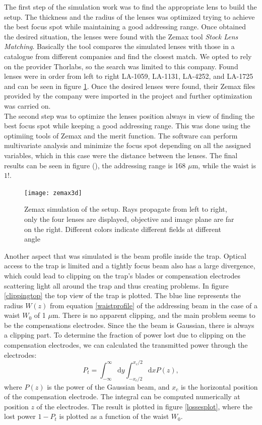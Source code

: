 The first step of the simulation work was to find the appropriate lens to build the setup. The thickness and the radius of the lenses was optimized trying to achieve the best focus spot while maintaining a good addressing range. Once obtained the desired situation, the lenses were found with the Zemax tool \emph{Stock Lens Matching}. Basically the tool compares the simulated lenses with those in a catalogue from different companies and find the closest match. We opted to rely on the provider Thorlabs, so the search was limited to this company. Found lenses were in order from left to right LA-1059, LA-1131, LA-4252, and LA-1725 and can be seen in figure \ref{zemaxview}. Once the desired lenses were found, their Zemax files provided by the company were imported in the project and further optimization was carried on.\\
The second step was to optimize the lenses position always in view of finding the best focus spot while keeping a good addressing range. This was done using the optimiing tools of Zemax and the merit function. The software can perform multivariate analysis and minimize the focus spot depending on all the assigned variables, which in this case were the distance between the lenses. The final results can be seen in figure (), the addressing range is 168 $\mu$m, while the waist is $1$!.

\begin{figure}
\centering
\texttt{[image: zemax3d]}
\caption{Zemax simulation of the setup. Rays propagate from left to right, only the four lenses are displayed, objective and image plane are far on the right. Different colors indicate different fields at different angle}
\label{zemaxview}
\end{figure}


Another aspect that was simulated is the beam profile inside the trap. Optical access to the trap is limited and a tightly focus beam also has a large divergence, which could lead to clipping on the trap's blades or compensation electrodes scattering light all around the trap and thus creating problems. In figure \ref{clippingtop} the top view of the trap is plotted. The blue line represents the radius $W(z)$ from equation \ref{waistprofile} of the addressing beam in the case of a waist $W_0$ of 1 $\mu$m. There is no apparent clipping, and the main problem seems to be the compensations electrodes. Since the the beam is Gaussian, there is always a clipping part. To determine the fraction of power lost due to clipping on the compensation electrodes, we can calculated the transmitted power through the electrodes:
\begin{equation}
P_{t} = \int_{-\infty}^{\infty}\text{d}y \int_{-x_c/2}^{x_c/2}\text{d}x P(z),
\end{equation}
where $P(z)$ is the power of the Gaussian beam, and $x_c$ is the horizontal position of the compensation electrode. The integral can be computed numerically at position $z$ of the electrodes. The result is plotted in figure \ref{lossesplot}, where the lost power $1-P_{t}$ is plotted as a function of the waist $W_0$.

